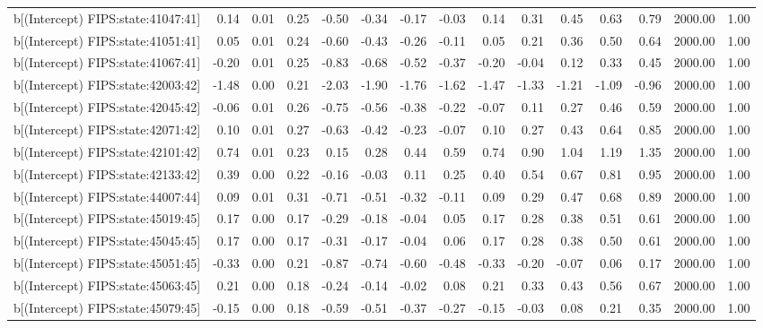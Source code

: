 \begin{table}[ht]
\begin{tabular}{rrrrrrrrrrrrrrr}
  b[(Intercept) FIPS:state:41047:41] & 0.14 & 0.01 & 0.25 & -0.50 & -0.34 & -0.17 & -0.03 & 0.14 & 0.31 & 0.45 & 0.63 & 0.79 & 2000.00 & 1.00 \\ 
  b[(Intercept) FIPS:state:41051:41] & 0.05 & 0.01 & 0.24 & -0.60 & -0.43 & -0.26 & -0.11 & 0.05 & 0.21 & 0.36 & 0.50 & 0.64 & 2000.00 & 1.00 \\ 
  b[(Intercept) FIPS:state:41067:41] & -0.20 & 0.01 & 0.25 & -0.83 & -0.68 & -0.52 & -0.37 & -0.20 & -0.04 & 0.12 & 0.33 & 0.45 & 2000.00 & 1.00 \\ 
  b[(Intercept) FIPS:state:42003:42] & -1.48 & 0.00 & 0.21 & -2.03 & -1.90 & -1.76 & -1.62 & -1.47 & -1.33 & -1.21 & -1.09 & -0.96 & 2000.00 & 1.00 \\ 
  b[(Intercept) FIPS:state:42045:42] & -0.06 & 0.01 & 0.26 & -0.75 & -0.56 & -0.38 & -0.22 & -0.07 & 0.11 & 0.27 & 0.46 & 0.59 & 2000.00 & 1.00 \\ 
  b[(Intercept) FIPS:state:42071:42] & 0.10 & 0.01 & 0.27 & -0.63 & -0.42 & -0.23 & -0.07 & 0.10 & 0.27 & 0.43 & 0.64 & 0.85 & 2000.00 & 1.00 \\ 
  b[(Intercept) FIPS:state:42101:42] & 0.74 & 0.01 & 0.23 & 0.15 & 0.28 & 0.44 & 0.59 & 0.74 & 0.90 & 1.04 & 1.19 & 1.35 & 2000.00 & 1.00 \\ 
  b[(Intercept) FIPS:state:42133:42] & 0.39 & 0.00 & 0.22 & -0.16 & -0.03 & 0.11 & 0.25 & 0.40 & 0.54 & 0.67 & 0.81 & 0.95 & 2000.00 & 1.00 \\ 
  b[(Intercept) FIPS:state:44007:44] & 0.09 & 0.01 & 0.31 & -0.71 & -0.51 & -0.32 & -0.11 & 0.09 & 0.29 & 0.47 & 0.68 & 0.89 & 2000.00 & 1.00 \\ 
  b[(Intercept) FIPS:state:45019:45] & 0.17 & 0.00 & 0.17 & -0.29 & -0.18 & -0.04 & 0.05 & 0.17 & 0.28 & 0.38 & 0.51 & 0.61 & 2000.00 & 1.00 \\ 
  b[(Intercept) FIPS:state:45045:45] & 0.17 & 0.00 & 0.17 & -0.31 & -0.17 & -0.04 & 0.06 & 0.17 & 0.28 & 0.38 & 0.50 & 0.61 & 2000.00 & 1.00 \\ 
  b[(Intercept) FIPS:state:45051:45] & -0.33 & 0.00 & 0.21 & -0.87 & -0.74 & -0.60 & -0.48 & -0.33 & -0.20 & -0.07 & 0.06 & 0.17 & 2000.00 & 1.00 \\ 
  b[(Intercept) FIPS:state:45063:45] & 0.21 & 0.00 & 0.18 & -0.24 & -0.14 & -0.02 & 0.08 & 0.21 & 0.33 & 0.43 & 0.56 & 0.67 & 2000.00 & 1.00 \\ 
  b[(Intercept) FIPS:state:45079:45] & -0.15 & 0.00 & 0.18 & -0.59 & -0.51 & -0.37 & -0.27 & -0.15 & -0.03 & 0.08 & 0.21 & 0.35 & 2000.00 & 1.00 \\ 

\end{tabular}
\end{table}
